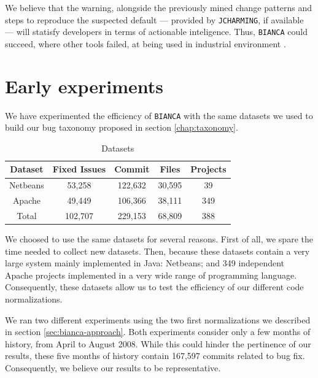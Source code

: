 We believe that the warning, alongside the previously mined change patterns and steps to reproduce the suspected default --- provided by {\tt JCHARMING}, if available --- will statisfy developers in terms of actionable inteligence.
Thus, {\tt BIANCA} could succeed, where other tools failed, at being used in industrial environment	\cite{Lewis2013}.


\section{Early experiments}

We have experimented the efficiency of {\tt BIANCA} with the same datasets we used to build our bug taxonomy proposed in section \ref{chap:taxonomy}.

\begin{table}[h]
\begin{center}
\begin{tabular}{@{}c|c|c|c|c@{}}
\textbf{Dataset} & \textbf{Fixed Issues} & \textbf{Commit} & \textbf{Files} & \textbf{Projects} \\ \hline \hline
Netbeans         & 53,258          & 122,632     & 30,595         & 39                \\
Apache           & 49,449          & 106,366     & 38,111         & 349               \\
Total            & 102,707         & 229,153     & 68,809         & 388               \\ \hline \hline

\end{tabular}
\end{center}

\caption{Datasets\label{table:datasets-bianca}}
\end{table}

We choosed to use the same datasets for several reasons. First of all, we spare the time needed to collect new datasets. Then, because these datasets contain a very large system mainly implemented in Java: Netbeans; and 349 independent Apache projects implemented in a very wide range of programming language. Consequently, these datasets allow us to test the efficiency of our different code normalizations.

We ran two different experiments using the two first normalizations we described in section \ref{sec:bianca-approach}. Both experiments consider only a few months of history, from April to August 2008. While this could hinder the pertinence of our results, these five months of history contain 167,597 commits related to bug fix. Consequently, we believe our results to be representative.

